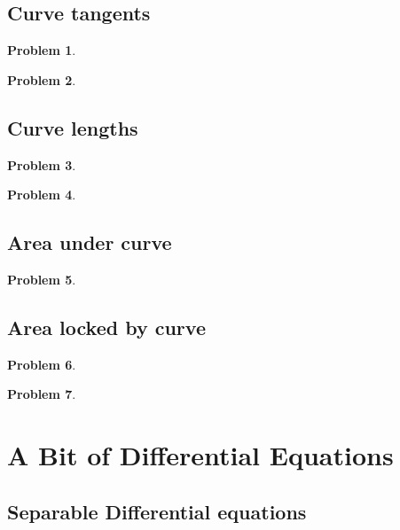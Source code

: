 \documentclass{article}
\newtheorem{problem}{Problem}
\begin{document}
\subsection{Curve tangents}
\begin{problem}

\end{problem}
\begin{problem}

\end{problem}
\subsection{Curve lengths}
\begin{problem}

\end{problem}


\begin{problem}

\end{problem}
\subsection{Area under curve}
\begin{problem}

\end{problem}
\subsection{Area locked by  curve}
\begin{problem}

\end{problem}


\begin{problem}

\end{problem}
\section{A Bit of Differential Equations}
\subsection{Separable Differential equations}
\end{document}
